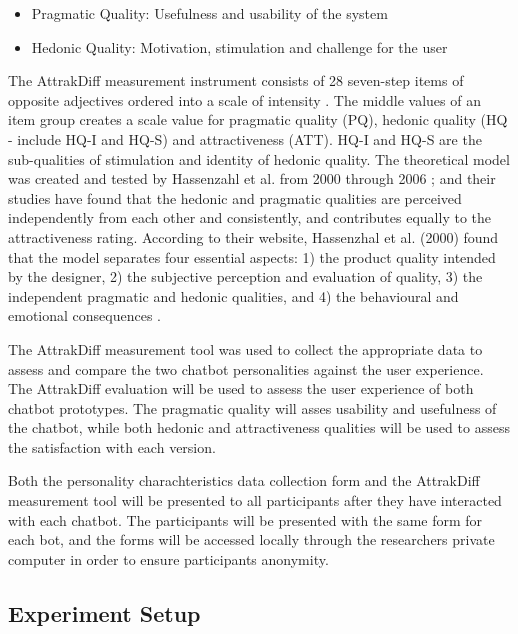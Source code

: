      \begin{itemize}
        \item Pragmatic Quality: Usefulness and usability of the system
        \item Hedonic Quality: Motivation, stimulation and challenge for the user
    \end{itemize}
    
    The AttrakDiff measurement instrument consists of 28 seven-step items of opposite adjectives ordered into a scale of intensity \citep{attrakdiff2013}. The middle values of an item group creates a scale value for pragmatic quality (PQ), hedonic quality (HQ - include HQ-I and HQ-S) and attractiveness (ATT). HQ-I and HQ-S are the sub-qualities of stimulation and identity of hedonic quality. The theoretical model was created and tested by Hassenzahl et al. from 2000 through 2006 \citep{Hassenzahl2000, Hassenzahl2001}; and their studies have found that the hedonic and pragmatic qualities are perceived independently from each other and consistently, and contributes equally to the attractiveness rating. According to their website, Hassenzhal et al. (2000) found that the model separates four essential aspects: 1) the product quality intended by the designer, 2) the subjective perception and evaluation of quality, 3) the independent pragmatic and hedonic qualities, and 4) the behavioural and emotional consequences \citep{attrakdiff2013}.
    
    The AttrakDiff measurement tool was used to collect the appropriate data to assess and compare the two chatbot personalities against the user experience. The AttrakDiff evaluation will be used to assess the user experience of both chatbot prototypes. The pragmatic quality will asses usability and usefulness of the chatbot, while both hedonic and attractiveness qualities will be used to assess the satisfaction with each version.
    
    Both the personality charachteristics data collection form and the AttrakDiff measurement tool will be presented to all participants after they have interacted with each chatbot. The participants will be presented with the same form for each bot, and the forms will be accessed locally through the researchers private computer in order to ensure participants anonymity. 
    
    \subsection{Experiment Setup}
    
